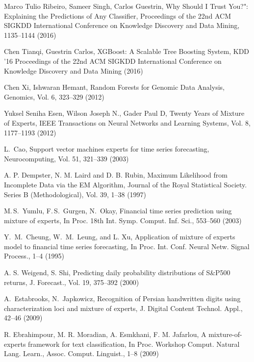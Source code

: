 \begin{thebibliography}{}
%
%
Marco Tulio Ribeiro, Sameer Singh, Carlos Guestrin, Why Should I Trust You?": Explaining the Predictions of Any Classifier, Proceedings of the 22nd ACM SIGKDD International Conference on Knowledge Discovery and Data Mining, 1135--1144 (2016)

Chen Tianqi, Guestrin Carlos, XGBoost: A Scalable Tree Boosting System, KDD ’16 Proceedings of the 22nd ACM SIGKDD International Conference on Knowledge Discovery and Data Mining (2016)

Chen Xi, Ishwaran Hemant, Random Forests for Genomic Data Analysis, Genomics, Vol. 6, 323--329 (2012)

Yuksel Seniha Esen, Wilson Joseph N., Gader Paul D, Twenty Years of Mixture of Experts, IEEE Transactions on Neural Networks and Learning Systems, Vol. 8, 1177--1193 (2012)

L.~Cao, Support vector machines experts for time series forecasting, Neurocomputing, Vol. 51, 321--339 (2003)

A. P. Dempster, N. M. Laird and D. B. Rubin, Maximum Likelihood from Incomplete Data via the EM Algorithm, Journal of the Royal Statistical Society. Series B (Methodological), Vol. 39, 1--38 (1997)

M.\,S.~Yumlu, F.\,S.~Gurgen,  N.~Okay, Financial time series prediction using mixture of experts, In Proc. 18th Int. Symp. Comput. Inf. Sci., 553--560 (2003)

Y.~M.~Cheung, W.~M.~Leung, and L. Xu,  Application of mixture of experts model to financial time series forecasting, In Proc. Int. Conf. Neural Netw. Signal Process., 1--4 (1995)

A. S. Weigend, S. Shi, Predicting daily probability distributions of S\&P500 returns, J. Forecast., Vol. 19, 375--392 (2000)

A.~Estabrooks, N.~Japkowicz, Recognition of Persian handwritten digits using characterization loci and mixture of experts, J. Digital Content Technol. Appl., 42--46 (2009)

R. Ebrahimpour, M. R. Moradian, A. Esmkhani, F. M. Jafarlou, A mixture-of-experts framework for text classification, In Proc. Workshop Comput. Natural Lang. Learn., Assoc. Comput. Linguist., 1--8 (2009)


\end{thebibliography}
